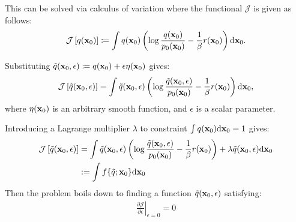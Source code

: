This can be solved via calculus of variation where the functional $\mathcal{J}$ is given as follows:
\begin{align}
    \nonumber
    \mathcal{J} \left[ q(\mathbf{x}_0) \right] \coloneqq \int q(\mathbf{x}_0) \left( \log \frac{q(\mathbf{x}_0)}{p_0 (\mathbf{x}_0)}-\frac{1}{\beta}r(\mathbf{x}_0) \right)\mathrm{d} \mathbf{x}_0.
\end{align}

Substituting $\tilde{q}(\mathbf{x}_0, \epsilon) \coloneqq q(\mathbf{x}_0) + \epsilon \eta(\mathbf{x}_0)$ gives:
\begin{align}
    \nonumber
    \mathcal{J} \left[ \tilde{q}(\mathbf{x}_0, \epsilon) \right] = \int \tilde{q}(\mathbf{x}_0, \epsilon) \left( \log \frac{\tilde{q}(\mathbf{x}_0, \epsilon)}{p_0 (\mathbf{x}_0)}-\frac{1}{\beta} r(\mathbf{x}_0) \right)\mathrm{d} \mathbf{x}_0, 
\end{align}
where $\eta(\mathbf{x}_0)$ is an arbitrary smooth function, and $\epsilon$ is a scalar parameter. 


Introducing a Lagrange multiplier $\lambda$ to constraint $\int q(\mathbf{x}_0) \mathrm{d} \mathbf{x}_0 = 1$ gives:
\begin{align}
    \nonumber
    \mathcal{J} \left[ \tilde{q}(\mathbf{x}_0, \epsilon) \right] &= \int \tilde{q}(\mathbf{x}_0, \epsilon) \left( \log \frac{\tilde{q}(\mathbf{x}_0, \epsilon)}{p_0 (\mathbf{x}_0)}-\frac{1}{\beta}r(\mathbf{x}_0) \right) +\lambda \tilde{q}(\mathbf{x}_0, \epsilon) \mathrm{d} \mathbf{x}_0\\
    \nonumber
    & :=\int f\{ \tilde{q};\mathbf{x}_0\} \mathrm{d} \mathbf{x}_0
\end{align}
Then the problem boils down to finding a function $\tilde{q}(\mathbf{x}_0, \epsilon)$ satisfying:
\begin{align}
    \nonumber
    \left. \frac{\partial \mathcal{J}}{\partial \epsilon} \right|_{\epsilon=0} = 0
\end{align}

